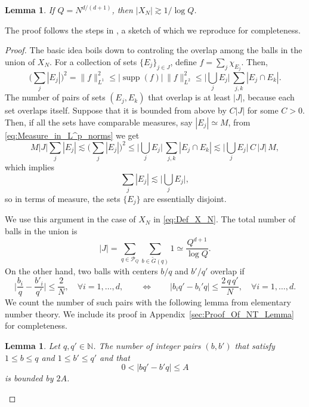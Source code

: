 \documentclass[11pt,reqno]{amsart}
\newtheorem{lem}[thm]{Lemma}
\theoremstyle{definition}
\numberwithin{equation}{section}
\theoremstyle{remark}
\begin{document}
\begin{lem}
    If $Q = N^{d/(d+1)}$, then $|X_N| \gtrsim 1/\log Q$.
\end{lem}
The proof follows the steps in \cite[Section 4]{AnChuPierce2023}, a sketch of which we reproduce for completeness. 
\begin{proof}
The basic idea boils down to controling the overlap among the balls in the union of $X_N$. 
For a collection of sets $\{E_j\}_{j \in J}$, define $f = \sum_j \chi_{E_j}$. Then, 
\begin{equation}\label{eq:Measure_in_L^p_norms}
    \Big( \sum_j |E_j| \Big)^2
    = \lVert f \rVert_{L^1}^2 
    \leq |\operatorname{supp}(f)| \, \lVert f \rVert_{L^2}^2
    \leq \Big| \bigcup_j E_j \Big| \, \sum_{j,k} |E_j \cap E_k|.
\end{equation}
The number of pairs of sets $(E_j,E_k)$ that overlap is at least $|J|$,
because each set overlaps itself.
Suppose that it is bounded from above by $C |J|$ for some $C > 0$. 
Then, if all the sets have comparable measures, say $|E_j| \simeq M$, 
from \eqref{eq:Measure_in_L^p_norms} we get 
\begin{equation}\label{eq:Disjointness_Condition}
    M |J| \sum_j |E_j| 
    \lesssim \Big( \sum_j |E_j| \Big)^2 
    \leq \Big| \bigcup_j E_j \Big| \, \sum_{j,k} |E_j \cap E_k|
    \lesssim  \Big| \bigcup_j E_j \Big| \, C \, |J|\,  M,
\end{equation}
which implies  
\begin{equation}\label{eq:Disjointness_Conclusion}
    \sum_j |E_j| \lesssim  \Big| \bigcup_j E_j \Big|, 
\end{equation}
so in terms of measure, the sets $\{E_j\}$ are essentially disjoint.

We use this argument in the case of $X_N$ in \eqref{eq:Def_X_N}. 
The total number of balls in the union is 
\begin{equation}
    |J| = \sum_{q \in \mathcal P_Q} \sum_{b \in \widetilde{G}(q)} 1 \simeq \frac{Q^{d+1}}{\log Q}. 
\end{equation}
On the other hand, 
two balls with centers $b/q$ and $b'/q'$ overlap if 
\begin{equation}\label{eq:Overlap_Condition}
    \Big| \frac{b_i}{q} - \frac{b'_i}{q'} \Big| \leq \frac{2}{N}, \quad \forall i = 1, \ldots, d, 
    \qquad \Longleftrightarrow \qquad 
    | b_iq' - b_i' q| \leq \frac{2\, q\, q'}{N}, \quad \forall i = 1, \ldots, d.  
\end{equation}
We count the number of such pairs with the following lemma from elementary number theory.
We include its proof in Appendix~\ref{sec:Proof_Of_NT_Lemma} for completeness. 
\begin{lem}\label{thm:Lemma_Counting}
    Let $q,q' \in \mathbb N$. The number of integer pairs $(b,b')$ that satisfy $1 \leq b \leq q$ and $1 \leq b' \leq q'$ and that 
    \begin{equation}\label{eq A}
        0 < |bq' - b'q| \leq A
    \end{equation}
    is bounded by $2A$. 
\end{lem}




\end{proof}
\end{document}
